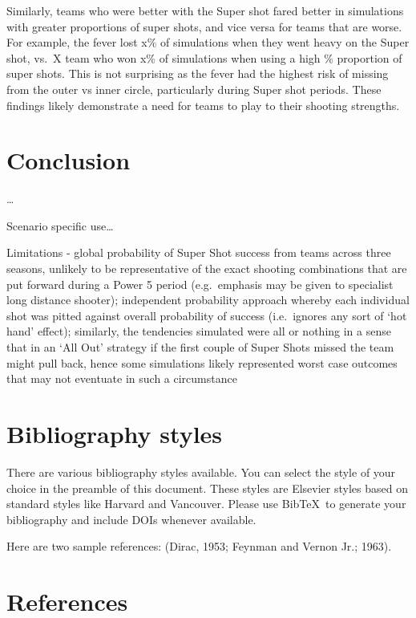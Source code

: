 \documentclass[]{elsarticle} %
\begin{document}
Similarly, teams who were better with the Super shot fared better in
simulations with greater proportions of super shots, and vice versa for
teams that are worse. For example, the fever lost x\% of simulations
when they went heavy on the Super shot, vs.~X team who won x\% of
simulations when using a high \% proportion of super shots. This is not
surprising as the fever had the highest risk of missing from the outer
vs inner circle, particularly during Super shot periods. These findings
likely demonstrate a need for teams to play to their shooting strengths.

\hypertarget{conclusion}{%
\section{Conclusion}\label{conclusion}}

\ldots{}

Scenario specific use\ldots{}

Limitations - global probability of Super Shot success from teams across
three seasons, unlikely to be representative of the exact shooting
combinations that are put forward during a Power 5 period (e.g.~emphasis
may be given to specialist long distance shooter); independent
probability approach whereby each individual shot was pitted against
overall probability of success (i.e.~ignores any sort of `hot hand'
effect); similarly, the tendencies simulated were all or nothing in a
sense that in an `All Out' strategy if the first couple of Super Shots
missed the team might pull back, hence some simulations likely
represented worst case outcomes that may not eventuate in such a
circumstance

\hypertarget{bibliography-styles}{%
\section{Bibliography styles}\label{bibliography-styles}}

There are various bibliography styles available. You can select the
style of your choice in the preamble of this document. These styles are
Elsevier styles based on standard styles like Harvard and Vancouver.
Please use BibTeX~to generate your bibliography and include DOIs
whenever available.

Here are two sample references: (Dirac, 1953; Feynman and Vernon Jr.;
1963).

\hypertarget{references}{%
\section*{References}\label{references}}
\end{document}
